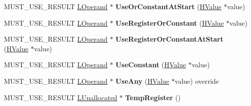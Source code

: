 \begin{DoxyCompactItemize}
\item 
M\+U\+S\+T\+\_\+\+U\+S\+E\+\_\+\+R\+E\+S\+U\+LT \hyperlink{classv8_1_1internal_1_1_l_operand}{L\+Operand} $\ast$ {\bfseries Use\+Or\+Constant\+At\+Start} (\hyperlink{classv8_1_1internal_1_1_h_value}{H\+Value} $\ast$value)\hypertarget{classv8_1_1internal_1_1_l_chunk_builder_a1920a3bd12058c2d1bfc0097372b26db}{}\label{classv8_1_1internal_1_1_l_chunk_builder_a1920a3bd12058c2d1bfc0097372b26db}

\item 
M\+U\+S\+T\+\_\+\+U\+S\+E\+\_\+\+R\+E\+S\+U\+LT \hyperlink{classv8_1_1internal_1_1_l_operand}{L\+Operand} $\ast$ {\bfseries Use\+Register\+Or\+Constant} (\hyperlink{classv8_1_1internal_1_1_h_value}{H\+Value} $\ast$value)\hypertarget{classv8_1_1internal_1_1_l_chunk_builder_aad48ff5905d902d80cf89a09debdba2e}{}\label{classv8_1_1internal_1_1_l_chunk_builder_aad48ff5905d902d80cf89a09debdba2e}

\item 
M\+U\+S\+T\+\_\+\+U\+S\+E\+\_\+\+R\+E\+S\+U\+LT \hyperlink{classv8_1_1internal_1_1_l_operand}{L\+Operand} $\ast$ {\bfseries Use\+Register\+Or\+Constant\+At\+Start} (\hyperlink{classv8_1_1internal_1_1_h_value}{H\+Value} $\ast$value)\hypertarget{classv8_1_1internal_1_1_l_chunk_builder_a9938448fb44184877f03dfd9f5cf94b3}{}\label{classv8_1_1internal_1_1_l_chunk_builder_a9938448fb44184877f03dfd9f5cf94b3}

\item 
M\+U\+S\+T\+\_\+\+U\+S\+E\+\_\+\+R\+E\+S\+U\+LT \hyperlink{classv8_1_1internal_1_1_l_operand}{L\+Operand} $\ast$ {\bfseries Use\+Constant} (\hyperlink{classv8_1_1internal_1_1_h_value}{H\+Value} $\ast$value)\hypertarget{classv8_1_1internal_1_1_l_chunk_builder_ac3d53603d4ae2e0633327924490c7dcf}{}\label{classv8_1_1internal_1_1_l_chunk_builder_ac3d53603d4ae2e0633327924490c7dcf}

\item 
M\+U\+S\+T\+\_\+\+U\+S\+E\+\_\+\+R\+E\+S\+U\+LT \hyperlink{classv8_1_1internal_1_1_l_operand}{L\+Operand} $\ast$ {\bfseries Use\+Any} (\hyperlink{classv8_1_1internal_1_1_h_value}{H\+Value} $\ast$value) override\hypertarget{classv8_1_1internal_1_1_l_chunk_builder_a5f7411e44131658a9b1203e99a131d5c}{}\label{classv8_1_1internal_1_1_l_chunk_builder_a5f7411e44131658a9b1203e99a131d5c}

\item 
M\+U\+S\+T\+\_\+\+U\+S\+E\+\_\+\+R\+E\+S\+U\+LT \hyperlink{classv8_1_1internal_1_1_l_unallocated}{L\+Unallocated} $\ast$ {\bfseries Temp\+Register} ()\hypertarget{classv8_1_1internal_1_1_l_chunk_builder_a3f16d8686df75776755522f2bc6b12d7}{}\label{classv8_1_1internal_1_1_l_chunk_builder_a3f16d8686df75776755522f2bc6b12d7}


\end{DoxyCompactItemize}
